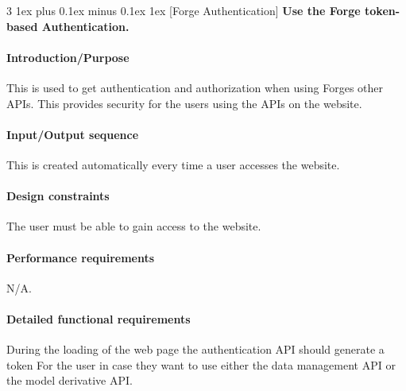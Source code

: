 \documentclass[letterpaper, 10pt, draftclsnofoot, compsoc, onecolumn]{IEEEtran}
\makeatletter
\def\subsubsection{\@startsection{subsubsection}%
                                 {3}%
                                 {\z@}%
                                 {1ex plus 0.1ex minus 0.1ex}%
                                 {1ex}%
                                 {\normalfont\normalsize}}%
\makeatother
\begin{document}

\subsubsection[{Forge Authentication}]{\rmfamily\bfseries\color{black}
	Use the Forge token-based Authentication.
}

\paragraph[Introduction/Purpose of this
feature]{\rmfamily\bfseries\color{black}
Introduction/Purpose }
	This is used to get authentication and authorization when using Forges other APIs. This provides security for the users using 
	the APIs on the website. 

\paragraph[Input/Output sequence for this
feature]{\rmfamily\bfseries\color{black}
Input/Output sequence }
	This is created automatically every time a user accesses the website.

\paragraph[Design constraints of this
feature]{\rmfamily\bfseries\color{black} Design constraints }
	The user must be able to gain access to the website.


\paragraph[Performance requirements of this
feature]{\rmfamily\bfseries\color{black}
Performance requirements }
	N/A. 

\paragraph[Detailed functional requirements of this
feature]{\rmfamily\bfseries\color{black}
Detailed functional requirements }
	During the loading of the web page the authentication API should generate a token For the user in case they want to use 
	either the data management API or the model derivative API. 

\end{document}
